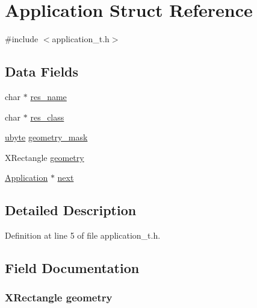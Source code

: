 \hypertarget{struct_application}{
\section{Application Struct Reference}
\label{struct_application}
}


{\ttfamily \#include $<$application\_\-t.h$>$}

\subsection*{Data Fields}
\begin{DoxyCompactItemize}
\item 
char $\ast$ \hyperlink{struct_application_ae178e0b707bb083445446bacf79138f0}{res\_\-name}
\item 
char $\ast$ \hyperlink{struct_application_a0aeb2856c5f54c1744e73632e7c595b7}{res\_\-class}
\item 
\hyperlink{arwm_8h_a5dd4f281954ce1405c92d62a427f839a}{ubyte} \hyperlink{struct_application_a0fe1a44b75e085ca96a18d3e7686c474}{geometry\_\-mask}
\item 
XRectangle \hyperlink{struct_application_aac33c74a9e108df3ab284cf3a1cc8e21}{geometry}
\item 
\hyperlink{struct_application}{Application} $\ast$ \hyperlink{struct_application_ab92200140565fb0b0819cf8388c58356}{next}
\end{DoxyCompactItemize}


\subsection{Detailed Description}


Definition at line 5 of file application\_\-t.h.



\subsection{Field Documentation}
\hypertarget{struct_application_aac33c74a9e108df3ab284cf3a1cc8e21}{
\subsubsection[{geometry}]{\setlength{\rightskip}{0pt plus 5cm}XRectangle {\bf geometry}}}
\label{struct_application_aac33c74a9e108df3ab284cf3a1cc8e21}


